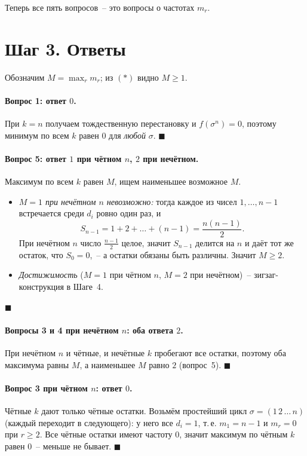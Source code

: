 \documentclass[12pt,a4paper]{article}
\begin{document}
Теперь все пять вопросов~-- это вопросы о частотах $m_r$.

\section{Шаг 3. Ответы}

Обозначим $M=\max_r m_r$; из $(\ast)$ видно $M\ge1$.

\paragraph{Вопрос 1: ответ $0$.} При $k=n$ получаем тождественную
перестановку и $f(\sigma^{n})=0$, поэтому минимум по всем $k$ равен $0$
для \emph{любой} $\sigma$. \hfill$\blacksquare$

\paragraph{Вопрос 5: ответ $1$ при чётном $n$, $2$ при нечётном.}
Максимум по всем $k$ равен $M$, ищем наименьшее возможное $M$.
\begin{itemize}
  \item \emph{$M=1$ при нечётном $n$ невозможно:} тогда каждое из чисел
        $1,\dots,n-1$ встречается среди $d_i$ ровно один раз, и
        \[
          S_{n-1}=1+2+\dots+(n-1)=\frac{n(n-1)}2 .
        \]
        При нечётном $n$ число $\frac{n-1}2$ целое, значит $S_{n-1}$
        делится на $n$ и даёт тот же остаток, что $S_0=0$,~-- а остатки
        обязаны быть различны. Значит $M\ge2$.
  \item \emph{Достижимость} ($M=1$ при чётном $n$, $M=2$ при нечётном)~--
        зигзаг-конструкция в Шаге~4.
\end{itemize}
\hfill$\blacksquare$

\paragraph{Вопросы 3 и 4 при нечётном $n$: оба ответа $2$.} При нечётном
$n$ и чётные, и нечётные $k$ пробегают все остатки, поэтому оба максимума
равны $M$, а наименьшее $M$ равно $2$ (вопрос~5). \hfill$\blacksquare$

\paragraph{Вопрос 3 при чётном $n$: ответ $0$.} Чётные $k$ дают только
чётные остатки. Возьмём простейший цикл $\sigma=(1\,2\,\dots\,n)$
(каждый переходит в следующего): у него все $d_i=1$, т.\,е. $m_1=n-1$ и
$m_r=0$ при $r\ge2$. Все чётные остатки имеют частоту $0$, значит максимум
по чётным $k$ равен $0$~-- меньше не бывает. \hfill$\blacksquare$
\end{document}
